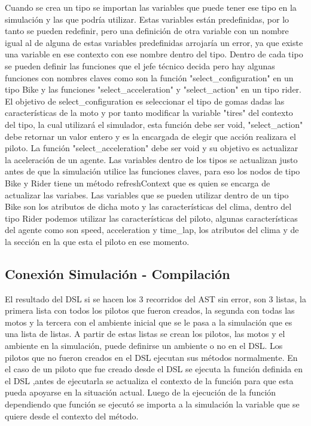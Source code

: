 \documentclass[12pt, letterpaper,spanish]{article}
\theoremstyle{definition}
\theoremstyle{remark}
\begin{document}
        Cuando se crea un tipo se importan las variables que puede tener ese tipo en la simulación y las que podría utilizar. Estas variables están predefinidas, por lo tanto se pueden redefinir, pero una definición de otra variable con un nombre igual al de alguna de estas variables predefinidas arrojaría un error, ya que existe una variable en ese contexto con ese nombre dentro del tipo. Dentro de cada tipo se pueden definir las funciones que el jefe técnico decida pero hay algunas funciones con nombres claves como son la función "select\_configuration" en un tipo Bike y las funciones "select\_acceleration" y "select\_action" en un tipo rider. El objetivo de select\_configuration es seleccionar el tipo de gomas dadas las características de la moto y por tanto modificar la variable "tires" del contexto del tipo, la cual utilizará el simulador, esta función debe ser void, "select\_action" debe retornar un valor entero y es la encargada de elegir que acción realizara el piloto. La función "select\_acceleration" debe ser void y su objetivo es actualizar la aceleración de un agente. Las variables dentro de los tipos se actualizan justo antes de que la simulación utilice las funciones claves, para eso los nodos de tipo Bike y Rider tiene un método refreshContext que es quien se encarga de actualizar las variabes. Las variables que se pueden utilizar dentro de un tipo Bike son los atributos de dicha moto y las características del clima, dentro del tipo Rider podemos utilizar las características del piloto, algunas características del agente como son speed, acceleration
        y time\_lap, los atributos del clima y de la sección en la que esta el piloto en ese momento.      


	\subsection{Conexión Simulación - Compilación}
		El resultado del DSL si se hacen los 3 recorridos del AST sin error, son 3 listas, la primera lista con todos los pilotos que fueron
        creados, la segunda con todas las motos y la tercera con el ambiente inicial que se le pasa a la simulación que es una lista de listas.
        A partir de estas listas se crean los pilotos, las motos y el ambiente en la simulación, puede definirse un ambiente o no en el DSL. 
        Los pilotos que no fueron creados en el DSL ejecutan sus métodos normalmente. En el caso de un piloto que fue creado desde el DSL se ejecuta la función definida en el DSL ,antes de ejecutarla se actualiza el contexto de la función para que esta pueda apoyarse en la situación actual. Luego de la ejecución de la función dependiendo que función se ejecutó se importa a la simulación la variable que se quiere desde el contexto del método.    
			
\end{document}
